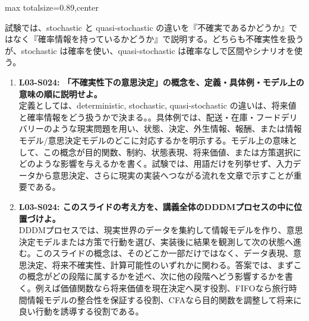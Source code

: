 \begin{minipage}[t]{0.58\textwidth}
\begin{adjustbox}{max totalsize={\textwidth}{0.89\textheight},center}
\begin{minipage}{\textwidth}
試験では、stochastic と quasi-stochastic の違いを『不確実であるかどうか』ではなく『確率情報を持っているかどうか』で説明する。どちらも不確実性を扱うが、stochastic は確率を使い、quasi-stochastic は確率なしで区間やシナリオを使う。\par{}\begin{enumerate}\item \textbf{L03-S024: 「不確実性下の意思決定」の概念を、定義・具体例・モデル上の意味の順に説明せよ。}\\定義としては、deterministic, stochastic, quasi-stochastic の違いは、将来値と確率情報をどう扱うかで決まる。。具体例では、配送・在庫・フードデリバリーのような現実問題を用い、状態、決定、外生情報、報酬、または情報モデル/意思決定モデルのどこに対応するかを明示する。モデル上の意味として、この概念が目的関数、制約、状態表現、将来価値、または方策選択にどのような影響を与えるかを書く。試験では、用語だけを列挙せず、入力データから意思決定、さらに現実の実装へつながる流れを文章で示すことが重要である。\item \textbf{L03-S024: このスライドの考え方を、講義全体のDDDMプロセスの中に位置づけよ。}\\DDDMプロセスでは、現実世界のデータを集約して情報モデルを作り、意思決定モデルまたは方策で行動を選び、実装後に結果を観測して次の状態へ進む。このスライドの概念は、そのどこか一部だけではなく、データ表現、意思決定、将来不確実性、計算可能性のいずれかに関わる。答案では、まずこの概念がどの段階に属するかを述べ、次に他の段階へどう影響するかを書く。例えば価値関数なら将来価値を現在決定へ戻す役割、FIFOなら旅行時間情報モデルの整合性を保証する役割、CFAなら目的関数を調整して将来に良い行動を誘導する役割である。\end{enumerate}
\end{minipage}
\end{adjustbox}
\end{minipage}


